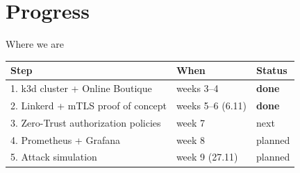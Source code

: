 \documentclass[9pt,aspectratio=169]{beamer}
\begin{document}
\section{Progress}

\begin{frame}{Where we are}
  \centering
  \vspace{4pt}
  \begin{tabular}{lll}
    \toprule
    \textbf{Step} & \textbf{When} & \textbf{Status} \\
    \midrule
    1. k3d cluster + Online Boutique      & weeks 3--4         & \textcolor{AccentGreen}{\textbf{done}} \\
    2. Linkerd + mTLS proof of concept    & weeks 5--6 (6.11)  & \textcolor{AccentGreen}{\textbf{done}} \\
    3. Zero-Trust authorization policies  & week 7             & \alert{next} \\
    4. Prometheus + Grafana               & week 8             & planned \\
    5. Attack simulation                  & week 9 (27.11)     & planned \\
    \bottomrule
  \end{tabular}
\end{frame}
\end{document}
